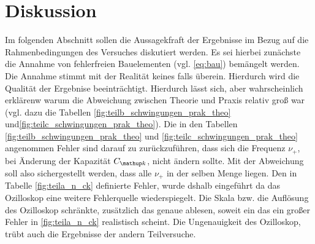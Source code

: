 \section{Diskussion}
Im folgenden Abschnitt sollen die Aussagekfraft der Ergebnisse im Bezug auf 
die Rahmenbedingungen des Versuches diskutiert werden.
Es sei hierbei zunächste die Annahme von fehlerfreien Bauelementen (vgl. \eqref{eq:bau}) 
bemängelt werden. Die Annahme stimmt mit der Realität keines falls überein.
Hierdurch wird die Qualität der Ergebnise beeinträchtigt.
Hierdurch lässt sich, aber wahrscheinlich erklärenw warum die Abweichung zwischen Theorie und Praxis
relativ groß war (vgl. dazu die Tabellen \ref{fig:teilb_schwingungen_prak_theo} und\ref{fig:teilc_schwingungen_prak_theo}).
Die in den Tabellen \ref{fig:teilb_schwingungen_prak_theo} und \ref{fig:teilc_schwingungen_prak_theo} angenommen Fehler sind darauf zu 
zurückzuführen, dass sich die Frequenz $\nu_+$, bei Änderung der Kapazität $C\ua{k}$, nicht ändern sollte.
Mit der Abweichung soll also sichergestellt werden, dass alle $\nu_+$ in der selben Menge liegen.
Den in Tabelle \ref{fig:teila_n_ck} definierte Fehler, wurde dshalb eingeführt da das Ozilloskop eine weitere Fehlerquelle
wiederspiegelt. Die Skala bzw. die Auflösung des Ozilloskop schränkte, zusätzlich das genaue ablesen, soweit ein das
ein großer Fehler in \ref{fig:teila_n_ck} realistisch scheint.
Die Ungenauigkeit des Ozilloskop, trübt auch die Ergebnisse der andern Teilversuche.


